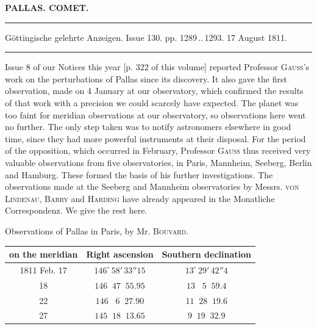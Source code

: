 \clearpage{}\hypertarget{native-332-lower}{}\label{native-332-lower}
\begin{center}\textbf{PALLAS. COMET.}\par\vspace{4pt}\hrule\vspace{4pt}\fontsize{10}{12}\selectfont Göttingische gelehrte Anzeigen. Issue 130. pp. 1289\,..\,1293. 17 August 1811.\par\vspace{4pt}\hrule\vspace{4pt}\end{center}

\par\indent Issue 8 of our Notices this year [p. 322 of this volume] reported Professor \textsc{Gauss}’s work on the perturbations of Pallas since its discovery. It also gave the first observation, made on 4 January at our observatory, which confirmed the results of that work with a precision we could scarcely have expected. The planet was too faint for meridian observations at our observatory, so observations here went no further. The only step taken was to notify astronomers elsewhere in good time, since they had more powerful instruments at their disposal. For the period of the opposition, which occurred in February, Professor \textsc{Gauss} thus received very valuable observations from five observatories, in Paris, Mannheim, Seeberg, Berlin and Hamburg. These formed the basis of his further investigations. The observations made at the Seeberg and Mannheim observatories by Messrs. \textsc{von Lindenau}, \textsc{Barry} and \textsc{Harding} have already appeared in the Monatliche Correspondenz. We give the rest here.

\begin{center}\fontsize{10}{12}\selectfont\setlength{\tabcolsep}{4pt}\renewcommand{\arraystretch}{1.15}
Observations of Pallas in Paris, by Mr. \textsc{Bouvard}.

\begin{tabular}{c|c|c}
on the meridian & Right ascension & Southern declination \\
\hline
1811 Feb. 17 & $146^\circ\,58'\,33''15$ & $13^\circ\,29'\,42''4$ \\
18 & $146\;\;47\;\;55.95$ & $13\;\;\;5\;\;59.4$ \\
22 & $146\;\;\;6\;\;27.90$ & $11\;\;28\;\;19.6$ \\
27 & $145\;\;18\;\;13.65$ & $9\;\;19\;\;32.9$ \\
\end{tabular}
\end{center}

